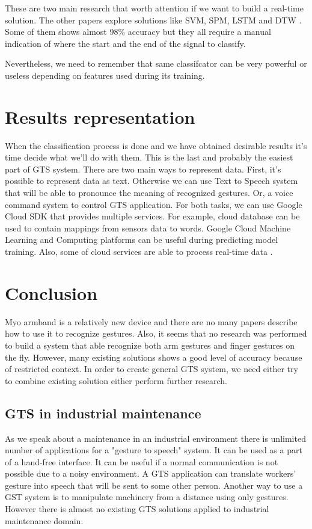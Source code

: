 \documentclass[conference,compsoc]{IEEEtran}
\begin{document}
These are two main research that worth attention if we want to build a real-time solution. The other papers explore solutions like SVM, SPM, LSTM \cite{sign_language_recognition} and DTW \cite{spectre}. Some of them shows almost 98\% accuracy but they all require a manual indication of where the start and the end of the signal to classify.

Nevertheless, we need to remember that same classifcator can be very powerful or useless depending on features used during its training. 


\section{Results representation}
When the classification process is done and we have obtained desirable results it's time decide what we'll do with them.  This is the last and probably the easiest part of GTS system. There are two main ways to represent data. First, it's possible to represent data as text. Otherwise we can use Text to Speech system that will be able to pronounce the meaning of recognized gestures. Or, a voice command system to control GTS application. For both tasks, we can use Google Cloud SDK that provides multiple services. For example, cloud database can be used to contain mappings from sensors data to words. Google Cloud Machine Learning and Computing platforms can be useful during predicting model training. Also, some of cloud services are able to process real-time data \cite{sign_language_recognition}. 

\section{Conclusion}

Myo armband is a relatively new device and there are no many papers describe how to use it to recognize gestures. Also, it seems that no research was performed to build a system that able recognize both arm gestures and finger gestures on the fly. However, many existing solutions shows a good level of accuracy because of restricted context. In order to create general GTS system, we need either try to combine existing solution either perform further research.

\subsection { GTS in industrial maintenance}
	As we speak about a maintenance in an industrial environment there is unlimited number of applications for a "gesture to speech" system. It can be used as a part of a hand-free interface. It can be useful if a normal communication is not possible due to a noisy environment. A GTS application can translate workers' gesture into speech that will be sent to some other person. Another way to use a GST system is to manipulate machinery from a distance using only gestures. However there is almost no existing GTS solutions applied to industrial maintenance domain. 
\end{document}
